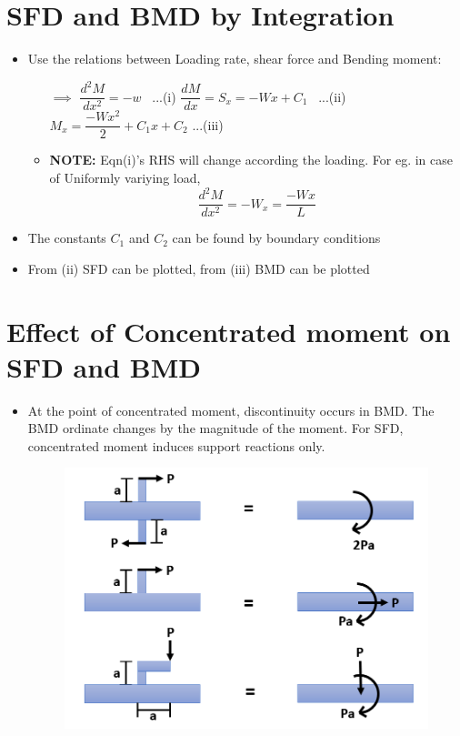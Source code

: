 \documentclass[8pt]{report}
\begin{document}
	\section{SFD and BMD by Integration}
		\begin{itemize}
			\item Use the relations between Loading rate, shear force and Bending moment:
				\begin{itemize}
					\item[$\implies$] $\boxed{\dfrac{d^2M}{dx^2}=-w}\;\;\;$...(i)  $\boxed{\dfrac{dM}{dx}=S_x=-Wx+C_1}\;\;\;$...(ii)  $\boxed{M_x = \dfrac{-Wx^2}{2} + C_1x + C_2}$   ...(iii)
					\item \textbf{NOTE: } Eqn(i)'s RHS will change according the loading. For eg. in case of Uniformly variying load, $$\boxed{\dfrac{d^2M}{dx^2}= -W_x = \dfrac{-Wx}{L}}$$
				\end{itemize}
			\item The constants $C_1$ and $C_2$ can be found by boundary conditions
			\item From (ii) SFD can be plotted, from (iii) BMD can be plotted
		\end{itemize}\hrulefill
	\section{Effect of Concentrated moment on SFD and BMD}
		\begin{itemize}
			\item At the point of concentrated moment, discontinuity occurs in BMD. The BMD ordinate changes by the magnitude of the moment. For SFD, concentrated moment induces support reactions only.
			\begin{figure}[H]
				\centering
				\includegraphics[scale=0.5]{concmoment}
			\end{figure}
		\end{itemize}\hrulefill
\end{document}
